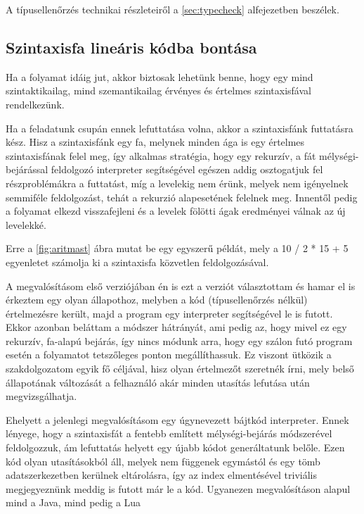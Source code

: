 A típusellenőrzés technikai részleteiről a \ref{sec:typecheck} alfejezetben beszélek.

\subsection{Szintaxisfa lineáris kódba bontása}

Ha a folyamat idáig jut, akkor biztosak lehetünk benne, hogy egy mind szintaktikailag, mind szemantikailag érvényes és értelmes szintaxisfával rendelkezünk.

Ha a feladatunk csupán ennek lefuttatása volna, akkor a szintaxisfánk futtatásra kész. Hisz a szintaxisfánk egy fa, melynek minden ága is egy értelmes szintaxisfának felel meg, így alkalmas stratégia, hogy egy rekurzív, a fát mélységi-bejárással feldolgozó interpreter segítségével egészen addig osztogatjuk fel részproblémákra a futtatást, míg a levelekig nem érünk, melyek nem igényelnek semmiféle feldolgozást, tehát a rekurzió alapesetének felelnek meg. Innentől pedig a folyamat elkezd visszafejleni és a levelek fölötti ágak eredményei válnak az új levelekké.

Erre a \ref{fig:aritmast} ábra mutat be egy egyszerű példát, mely a 10 / 2 * 15 + 5 egyenletet számolja ki a szintaxisfa közvetlen feldolgozásával.


A megvalósításom első verziójában én is ezt a verziót választottam és hamar el is érkeztem egy olyan állapothoz, melyben a kód (típusellenőrzés nélkül) értelmezésre került, majd a program egy interpreter segítségével le is futott. Ekkor azonban beláttam a módszer hátrányát, ami pedig az, hogy mivel ez egy rekurzív, fa-alapú bejárás, így nincs módunk arra, hogy egy szálon futó program esetén a folyamatot tetszőleges ponton megállíthassuk. Ez viszont ütközik a szakdolgozatom egyik fő céljával, hisz olyan értelmezőt szeretnék írni, mely belső állapotának változását a felhaználó akár minden utasítás lefutása után megvizsgálhatja.

Ehelyett a jelenlegi megvalósításom egy úgynevezett bájtkód interpreter. Ennek lényege, hogy a szintaxisfát a fentebb említett mélységi-bejárás módszerével feldolgozzuk, ám lefuttatás helyett egy újabb kódot generáltatunk belőle. Ezen kód olyan utasításokból áll, melyek nem függenek egymástól és egy tömb adatszerkezetben kerülnek eltárolásra, így az index elmentésével triviális megjegyeznünk meddig is futott már le a kód. Ugyanezen megvalósításon alapul mind a Java\cite{java}, mind pedig a Lua\cite{lua}

